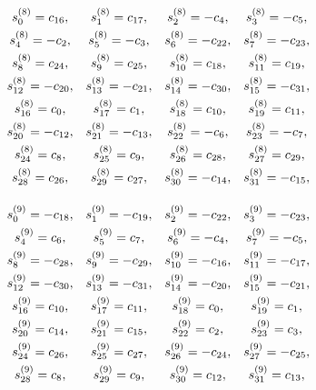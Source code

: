 \documentclass{jtacs}
\numberwithin{equation}{section}
\begin{document}
\begin{center}
\begin{adjustbox}{width=0.57\textwidth, margin=0 0 0 0}
$
\begin{array}{cccc}
\renewcommand*{\arraystretch}{1.5}
\begin{matrix}
s_{0}^{(8)}=c_{16}, & 	s_{1}^{(8)}=c_{17}, & 	s_{2}^{(8)}=-c_{4}, & 	s_{3}^{(8)}=-c_{5}, \\
s_{4}^{(8)}=-c_{2}, & 	s_{5}^{(8)}=-c_{3}, & 	s_{6}^{(8)}=-c_{22}, & 	s_{7}^{(8)}=-c_{23}, \\
s_{8}^{(8)}=c_{24}, & 	s_{9}^{(8)}=c_{25}, & 	s_{10}^{(8)}=c_{18}, & 	s_{11}^{(8)}=c_{19}, \\
s_{12}^{(8)}=-c_{20}, & 	s_{13}^{(8)}=-c_{21}, & 	s_{14}^{(8)}=-c_{30}, & 	s_{15}^{(8)}=-c_{31}, \\
s_{16}^{(8)}=c_{0}, & 	s_{17}^{(8)}=c_{1}, & 	s_{18}^{(8)}=c_{10}, & 	s_{19}^{(8)}=c_{11}, \\
s_{20}^{(8)}=-c_{12}, & 	s_{21}^{(8)}=-c_{13}, & 	s_{22}^{(8)}=-c_{6}, & 	s_{23}^{(8)}=-c_{7}, \\
s_{24}^{(8)}=c_{8}, & 	s_{25}^{(8)}=c_{9}, & 	s_{26}^{(8)}=c_{28}, & 	s_{27}^{(8)}=c_{29}, \\	s_{28}^{(8)}=c_{26}, & 	s_{29}^{(8)}=c_{27}, & 	s_{30}^{(8)}=-c_{14}, & 	s_{31}^{(8)}=-c_{15}, \\
\end{matrix}
\end{array}
$
\end{adjustbox}
\end{center}

\begin{center}
\begin{adjustbox}{width=0.57\textwidth, margin=0 0 0 0}
$
\begin{array}{cccc}
\renewcommand*{\arraystretch}{1.5}
\begin{matrix}
s_{0}^{(9)}=-c_{18}, & 	s_{1}^{(9)}=-c_{19}, & 	s_{2}^{(9)}=-c_{22}, & 	s_{3}^{(9)}=-c_{23}, \\
s_{4}^{(9)}=c_{6}, & 	s_{5}^{(9)}=c_{7}, & 	s_{6}^{(9)}=-c_{4}, & 	s_{7}^{(9)}=-c_{5}, \\
s_{8}^{(9)}=-c_{28}, & 	s_{9}^{(9)}=-c_{29}, & 	s_{10}^{(9)}=-c_{16}, & 	s_{11}^{(9)}=-c_{17}, \\
s_{12}^{(9)}=-c_{30}, & 	s_{13}^{(9)}=-c_{31}, & 	s_{14}^{(9)}=-c_{20}, & 	s_{15}^{(9)}=-c_{21}, \\
s_{16}^{(9)}=c_{10}, & 	s_{17}^{(9)}=c_{11}, & 	s_{18}^{(9)}=c_{0}, & 	s_{19}^{(9)}=c_{1}, \\
s_{20}^{(9)}=c_{14}, & 	s_{21}^{(9)}=c_{15}, & 	s_{22}^{(9)}=c_{2}, & 	s_{23}^{(9)}=c_{3}, \\
s_{24}^{(9)}=c_{26}, & 	s_{25}^{(9)}=c_{27}, & 	s_{26}^{(9)}=-c_{24}, & 	s_{27}^{(9)}=-c_{25}, \\	s_{28}^{(9)}=c_{8}, & 	s_{29}^{(9)}=c_{9}, & 	s_{30}^{(9)}=c_{12}, & 	s_{31}^{(9)}=c_{13}, \\
\end{matrix}
\end{array}
$
\end{adjustbox}
\end{center}
\end{document}
